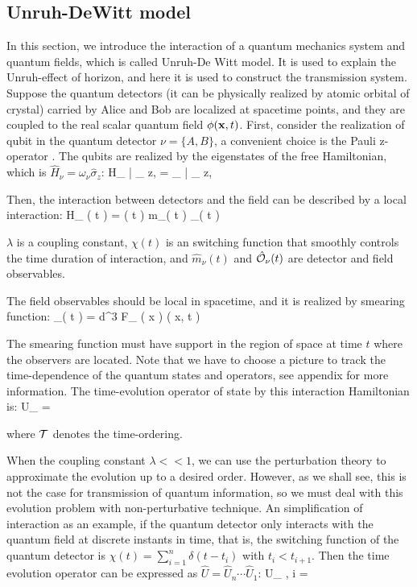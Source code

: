 \documentclass[a4paper,12pt]{article}
\begin{document}
\subsection*{Unruh-DeWitt model}
In this section, we introduce the interaction of a quantum mechanics system and quantum fields, which is called Unruh-De Witt model.
It is used to explain the Unruh-effect of horizon, and here it is used to construct the transmission system.
Suppose the quantum detectors (it can be physically realized by atomic orbital of crystal) carried by Alice and Bob are localized at spacetime points, and they are coupled to the real scalar quantum field $\phi( \mathbf x, t )$.
First, consider the realization of qubit in the quantum detector $ \nu = \{A, B\} $, a convenient choice is the Pauli z-operator \cite{PhysRevD.101.036014}.
The qubits are realized by the eigenstates of the free Hamiltonian, which is $ \hat H_{ \nu } = \omega_\nu \hat \sigma_z $:
\be
    \hat H_{ \nu } | \pm_{ z, \nu } \ar = \pm \omega_{ \nu } | \pm_{ z, \nu } \ar
\ee

Then, the interaction between detectors and the field can be described by a local interaction:
\be
    \hat H_{ \nu }( t ) = \lambda \chi( t ) \hat m_\nu( t ) \otimes {}_\nu ( t )
\ee

$ \lambda $ is a coupling constant, $\chi ( t )$ is an switching function that smoothly controls the time duration of interaction, and $\hat m_\nu( t )$ and $\hat{ \mathcal{ O } }_\nu ( t )$ are detector and field observables.

The field observables should be local in spacetime, and it is realized by smearing function:
\be
    _\nu ( t ) = \int{} d^{3}  F_{ \nu } ( \mb x )  ( \mb x, t )
\ee

The smearing function must have support in the region of space at time $t$ where the observers are located.
Note that we have to choose a picture to track the time-dependence of the quantum states and operators, see appendix for more information.
The time-evolution operator of state by this interaction Hamiltonian is:
\be
    \hat U_{ \nu } =  \exp {}
\ee

where $ \mathcal{ T } $ denotes the time-ordering. 

When the coupling constant $\lambda << 1$, we can use the perturbation theory to approximate the evolution up to a desired order.
However, as we shall see, this is not the case for transmission of quantum information, so we must deal with this evolution problem with non-perturbative technique.
An simplification of interaction as an example, if the quantum detector only interacts with the quantum field at discrete instants in time, that is, the switching function of the quantum detector is $ \chi ( t ) = \sum_{ i = 1 }^{ n } \delta ( t - t_i )$ with $ t_i < t_{ i + 1 } $.
Then the time evolution operator can be expressed as $ \hat U = \hat U_n \cdots \hat U_1 $:
\be
    \hat U_{ \nu, i } = \exp {}
\ee
\end{document}
